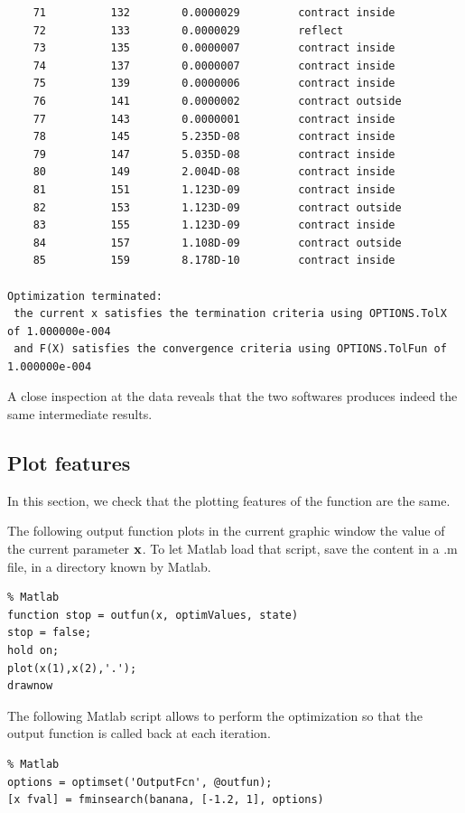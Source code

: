 \begin{lstlisting}
    71          132        0.0000029         contract inside     
    72          133        0.0000029         reflect             
    73          135        0.0000007         contract inside     
    74          137        0.0000007         contract inside     
    75          139        0.0000006         contract inside     
    76          141        0.0000002         contract outside    
    77          143        0.0000001         contract inside     
    78          145        5.235D-08         contract inside     
    79          147        5.035D-08         contract inside     
    80          149        2.004D-08         contract inside     
    81          151        1.123D-09         contract inside     
    82          153        1.123D-09         contract outside    
    83          155        1.123D-09         contract inside     
    84          157        1.108D-09         contract outside    
    85          159        8.178D-10         contract inside     

Optimization terminated:
 the current x satisfies the termination criteria using OPTIONS.TolX of 1.000000e-004
 and F(X) satisfies the convergence criteria using OPTIONS.TolFun of 1.000000e-004
\end{lstlisting}

A close inspection at the data reveals that the two softwares produces
indeed the same intermediate results. 

\subsection{Plot features}

In this section, we check that the plotting features of the 
 function are the same.

The following output function plots in the current graphic 
window the value of the current parameter $\mathbf{x}$.
To let Matlab load that script, save the content in a 
.m file, in a directory known by Matlab.

\lstset{language=matlabscript}
\begin{lstlisting}
% Matlab
function stop = outfun(x, optimValues, state)
stop = false;
hold on;
plot(x(1),x(2),'.');
drawnow
\end{lstlisting}

The following Matlab script allows to perform the optimization
so that the output function is called back at each iteration.

\lstset{language=matlabscript}
\begin{lstlisting}
% Matlab
options = optimset('OutputFcn', @outfun);
[x fval] = fminsearch(banana, [-1.2, 1], options)
\end{lstlisting}

